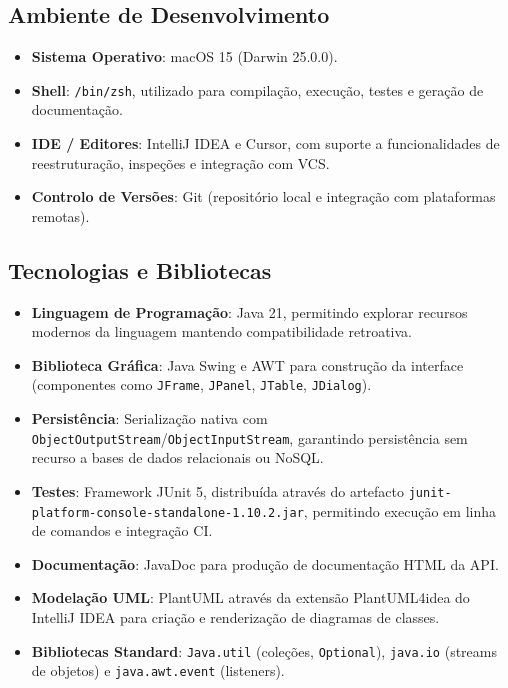 \documentclass[a4paper,12pt]{article}
\begin{document}
\subsection{Ambiente de Desenvolvimento}
\begin{itemize}
    \item \textbf{Sistema Operativo}: macOS 15 (Darwin 25.0.0).
    \item \textbf{Shell}: \texttt{/bin/zsh}, utilizado para compilação, execução, testes e geração de documentação.
    \item \textbf{IDE / Editores}: IntelliJ IDEA e Cursor, com suporte a funcionalidades de reestruturação, inspeções e integração com VCS.
    \item \textbf{Controlo de Versões}: Git (repositório local e integração com plataformas remotas).
\end{itemize}

\subsection{Tecnologias e Bibliotecas}
\begin{itemize}
    \item \textbf{Linguagem de Programação}: Java 21, permitindo explorar recursos modernos da linguagem mantendo compatibilidade retroativa.
    \item \textbf{Biblioteca Gráfica}: Java Swing e AWT para construção da interface (componentes como \texttt{JFrame}, \texttt{JPanel}, \texttt{JTable}, \texttt{JDialog}).
    \item \textbf{Persistência}: Serialização nativa com \texttt{ObjectOutputStream}/\texttt{ObjectInputStream}, garantindo persistência sem recurso a bases de dados relacionais ou NoSQL.
    \item \textbf{Testes}: Framework JUnit 5, distribuída através do artefacto \texttt{junit-platform-console-standalone-1.10.2.jar}, permitindo execução em linha de comandos e integração CI.
    \item \textbf{Documentação}: JavaDoc para produção de documentação HTML da API.
    \item \textbf{Modelação UML}: PlantUML através da extensão PlantUML4idea do IntelliJ IDEA para criação e renderização de diagramas de classes.
    \item \textbf{Bibliotecas Standard}: \texttt{Java.util} (coleções, \texttt{Optional}), \texttt{java.io} (streams de objetos) e \texttt{java.awt.event} (listeners).
\end{itemize}
\end{document}
